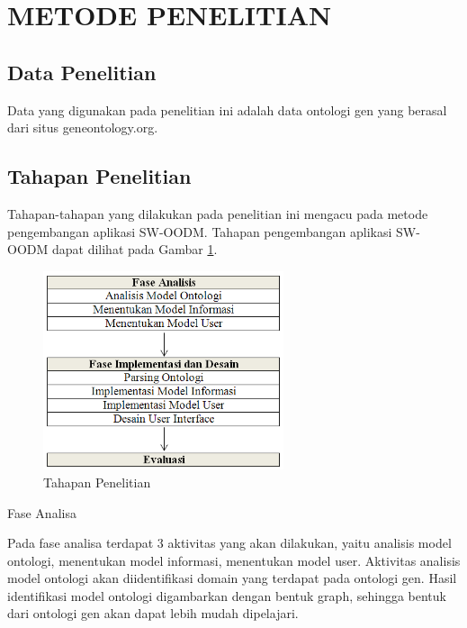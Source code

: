 \section*{METODE PENELITIAN}

\subsection*{Data Penelitian}

Data yang digunakan pada penelitian ini adalah data ontologi gen yang berasal dari situs geneontology.org.

\subsection*{Tahapan Penelitian}

Tahapan-tahapan yang dilakukan pada penelitian ini mengacu pada metode pengembangan aplikasi SW-OODM. Tahapan pengembangan aplikasi SW-OODM dapat dilihat pada Gambar \ref{fig:tahapan_penelitian}.

\begin{figure}[h!] %
	\centering
	\includegraphics[width=200pt]{kolokium_tahapan_penelitian_gb2.png}
	\caption{Tahapan Penelitian}
	\label{fig:tahapan_penelitian}
\end{figure}

Fase Analisa

Pada fase analisa terdapat 3 aktivitas yang akan dilakukan, yaitu analisis model ontologi, menentukan model informasi, menentukan model user. Aktivitas analisis model ontologi akan diidentifikasi domain yang terdapat pada ontologi gen. Hasil identifikasi model ontologi digambarkan dengan bentuk graph, sehingga bentuk dari ontologi gen akan dapat lebih mudah dipelajari.

